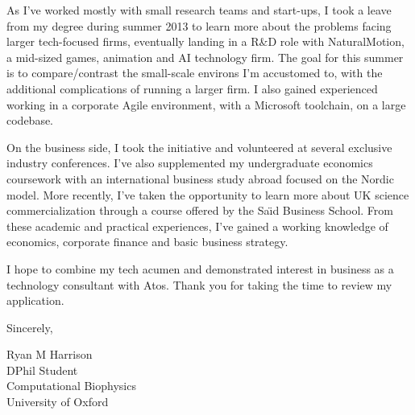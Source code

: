 \documentclass{../res}
\begin{document}
\begin{sloppypar}
\begin{resume}
As I've worked mostly with small research teams and start-ups, I took a leave from my degree during summer 2013 to learn more about the problems facing larger tech-focused firms, eventually landing in a R\&D role with NaturalMotion, a mid-sized games, animation and AI technology firm. The goal for this summer is to compare/contrast the small-scale environs I'm accustomed to, with the additional complications of running a larger firm. I also gained experienced working in a corporate Agile environment, with a Microsoft toolchain, on a large codebase.

On the business side, I took the initiative and volunteered at several exclusive industry conferences. I've also supplemented my undergraduate economics coursework with an international business study abroad focused on the Nordic model. More recently, I've taken the opportunity to learn more about UK science commercialization through a course offered by the Sa\"\i d Business School. From these academic and practical experiences, I've gained a working knowledge of economics, corporate finance and basic business strategy.

I hope to combine my tech acumen and demonstrated interest in business as a technology consultant with Atos. Thank you for taking the time to review my application.

\vspace{1\baselineskip}
Sincerely,
\vspace{2\baselineskip}

Ryan M Harrison \\
DPhil Student \\
Computational Biophysics\\
University of Oxford \\


\end{resume} 
\end{sloppypar}
\end{document}

